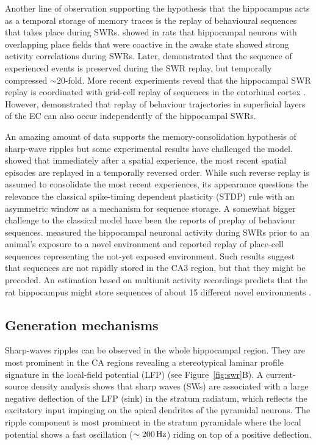     Another line of observation supporting the hypothesis that the hippocampus
    acts as a temporal storage of memory traces is the replay of behavioural
    sequences that takes place during SWRs. \cite{Wilson1994} showed in rats
    that hippocampal neurons with overlapping place fields that were coactive
    in the awake state showed strong activity correlations during SWRs. Later,
    \cite{Lee2002} demonstrated that the sequence of experienced events is
    preserved during the SWR replay, but temporally compressed $\sim$20-fold.
    More recent experiments reveal that the hippocampal SWR replay is
    coordinated with grid-cell replay of sequences in the entorhinal cortex
    \citep{Olafsdottir2016}. However, \cite{Oneill2017} demonstrated that
    replay of behaviour trajectories in superficial layers of the EC can also
    occur independently of the hippocampal SWRs.

    An amazing amount of data supports the memory-consolidation hypothesis of
    sharp-wave ripples but some experimental results have challenged
    the model. \cite{Foster2006} showed that immediately after a spatial
    experience, the most recent spatial episodes are replayed in a temporally
    reversed order. While such reverse replay is assumed to consolidate the
    most recent experiences, its appearance questions the relevance the
    classical spike-timing dependent plasticity (STDP) rule with an asymmetric
    window \citep{Bi1998} as a mechanism for sequence storage. A somewhat
    bigger challenge to the classical model have been the reports of preplay of
    behaviour sequences. \cite{Dragoi2011} measured the hippocampal neuronal activity
    during SWRs prior to an animal's exposure to a novel environment and reported
    replay of place-cell sequences representing the not-yet exposed
    environment. Such results suggest that sequences are not rapidly stored in
    the CA3 region, but that they might be precoded. An estimation based on
    multiunit activity recordings predicts that the rat hippocampus might store
    sequences of about 15 different novel environments \citep{Dragoi2013}.
    
  \subsection{Generation mechanisms}
    Sharp-waves ripples can be observed in the whole hippocampal region. They
    are most prominent in the CA regions revealing a stereotypical laminar
    profile signature in the local-field potential (LFP) (see
    Figure~\ref{fig:swr}B). A current-source density analysis shows that sharp
    waves (SWs) are associated with a large negative deflection of the LFP
    (sink) in the stratum radiatum, which reflects the excitatory input
    impinging on the apical dendrites of the pyramidal neurons. The ripple
    component is most prominent in the stratum pyramidale where the local
    potential shows a fast oscillation ($\sim200\rm \, Hz$) riding on top
    of a positive deflection.

